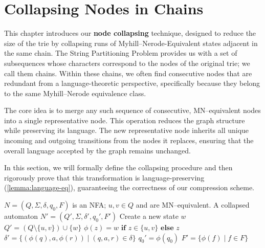\section{Collapsing Nodes in Chains} \label{sec:collapsing}
This chapter introduces our \textbf{node collapsing} technique, designed to reduce the size of the trie by collapsing runs of Myhill--Nerode-Equivalent states adjacent in the same chain. The String Partitioning Problem provides us with a set of subsequences whose characters correspond to the nodes of the original trie; we call them chains. Within these chains, we often find consecutive nodes that are redundant from a language-theoretic perspective, specifically because they belong to the same Myhill--Nerode equivalence class.

The core idea is to merge any such sequence of consecutive, MN--equivalent nodes into a single representative node. This operation reduces the graph structure while preserving its language. The new representative node inherits all unique incoming and outgoing transitions from the nodes it replaces, ensuring that the overall language accepted by the graph remains unchanged.

In this section, we will formally define the collapsing procedure and then rigorously prove that this transformation is language-preserving (\cref{lemma:language-eq}), guaranteeing the correctness of our compression scheme.

\begin{algorithm}[H]
\caption{$\textsc{Collapse}(N,u,v)$}
\label{alg:collapse}
\begin{algorithmic}[1]
\Require $N = (Q, \Sigma, \delta, q_0, F)$ is an NFA; $u,v \in Q$ and are MN--equivalent.
\Ensure A collapsed automaton $N'=(Q', \Sigma, \delta', q_0', F')$
    \State Create a new state $w$
    \State $Q' = (Q \setminus \{u,v\})\cup\{w\}$
    \State $\phi(z) = w \textbf{ if } z\in\{u, v\} \textbf{ else } z$
    \State $\delta' = \{ (\phi(q), a, \phi(r)) \mid (q, a, r) \in \delta \}$
    \State $q_0' = \phi(q_0)$
    \State $F' = \{ \phi(f) \mid f \in F \}$
\end{algorithmic}
\end{algorithm}


